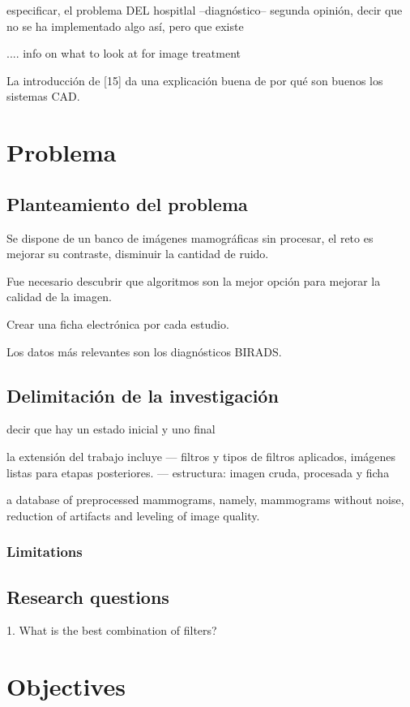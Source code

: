 especificar, el problema DEL
hospitlal --diagnóstico-- segunda opinión, decir que no se ha implementado algo
así, pero que existe
 
.... info on what to look at for image treatment 

La introducción de [15] da una explicación buena de por qué son buenos los
sistemas CAD.

\section{Problema}
\subsection{Planteamiento del problema}

Se dispone de un banco de imágenes mamográficas sin procesar, el reto es mejorar
su contraste, disminuir la cantidad de ruido.

Fue necesario descubrir que algoritmos son la mejor opción para mejorar la
calidad de la imagen.

Crear una ficha electrónica por cada estudio.

Los datos más relevantes son los diagnósticos BIRADS.


\subsection{Delimitación de la investigación}

decir que hay un estado inicial y uno final

la extensión del trabajo incluye --- filtros y tipos de filtros aplicados, imágenes listas para etapas posteriores. 
 --- estructura: imagen cruda, procesada y ficha

a database of preprocessed mammograms, namely, mammograms without noise,
reduction of artifacts and leveling of image quality.

\subsubsection{Limitations}

\subsection{Research questions}

1. What is the best combination of filters?

\section{Objectives}
